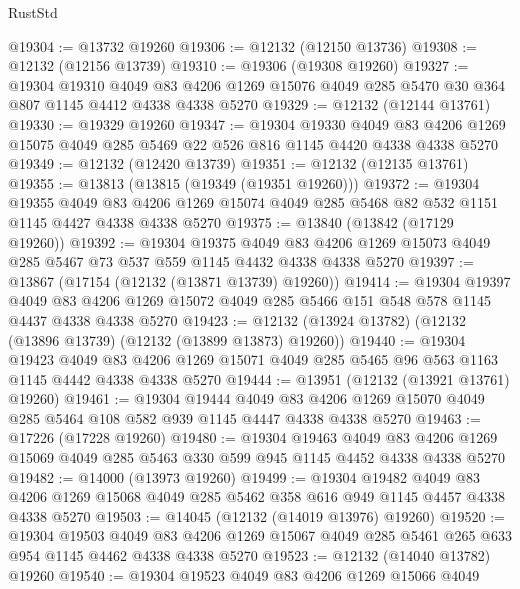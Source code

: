 \begin{lexlean}{RustStd}
\begin{coremodule}
{\begin{coremodule}
{{{{{{{{{{{{{{{{{{{{{{{{{{{{{{{{{{{{{{{{{{{{{{{{{{@19304 := @13732 @19260
@19306 := @12132 (@12150 @13736)
@19308 := @12132 (@12156 @13739)
@19310 := @19306 (@19308 @19260)
@19327 := @19304
    @19310
    @4049
    @83
    @4206
    @1269
    @15076
    @4049
    @285
    @5470
    @30
    @364
    @807
    @1145
    @4412
    @4338
    @4338
    @5270
@19329 := @12132 (@12144 @13761)
@19330 := @19329 @19260
@19347 := @19304
    @19330
    @4049
    @83
    @4206
    @1269
    @15075
    @4049
    @285
    @5469
    @22
    @526
    @816
    @1145
    @4420
    @4338
    @4338
    @5270
@19349 := @12132 (@12420 @13739)
@19351 := @12132 (@12135 @13761)
@19355 := @13813 (@13815 (@19349 (@19351 @19260)))
@19372 := @19304
    @19355
    @4049
    @83
    @4206
    @1269
    @15074
    @4049
    @285
    @5468
    @82
    @532
    @1151
    @1145
    @4427
    @4338
    @4338
    @5270
@19375 := @13840 (@13842 (@17129 @19260))
@19392 := @19304
    @19375
    @4049
    @83
    @4206
    @1269
    @15073
    @4049
    @285
    @5467
    @73
    @537
    @559
    @1145
    @4432
    @4338
    @4338
    @5270
@19397 := @13867 (@17154 (@12132 (@13871 @13739) @19260))
@19414 := @19304
    @19397
    @4049
    @83
    @4206
    @1269
    @15072
    @4049
    @285
    @5466
    @151
    @548
    @578
    @1145
    @4437
    @4338
    @4338
    @5270
@19423 := @12132 (@13924 @13782) (@12132 (@13896 @13739) (@12132 (@13899 @13873) @19260))
@19440 := @19304
    @19423
    @4049
    @83
    @4206
    @1269
    @15071
    @4049
    @285
    @5465
    @96
    @563
    @1163
    @1145
    @4442
    @4338
    @4338
    @5270
@19444 := @13951 (@12132 (@13921 @13761) @19260)
@19461 := @19304
    @19444
    @4049
    @83
    @4206
    @1269
    @15070
    @4049
    @285
    @5464
    @108
    @582
    @939
    @1145
    @4447
    @4338
    @4338
    @5270
@19463 := @17226 (@17228 @19260)
@19480 := @19304
    @19463
    @4049
    @83
    @4206
    @1269
    @15069
    @4049
    @285
    @5463
    @330
    @599
    @945
    @1145
    @4452
    @4338
    @4338
    @5270
@19482 := @14000 (@13973 @19260)
@19499 := @19304
    @19482
    @4049
    @83
    @4206
    @1269
    @15068
    @4049
    @285
    @5462
    @358
    @616
    @949
    @1145
    @4457
    @4338
    @4338
    @5270
@19503 := @14045 (@12132 (@14019 @13976) @19260)
@19520 := @19304
    @19503
    @4049
    @83
    @4206
    @1269
    @15067
    @4049
    @285
    @5461
    @265
    @633
    @954
    @1145
    @4462
    @4338
    @4338
    @5270
@19523 := @12132 (@14040 @13782) @19260
@19540 := @19304
    @19523
    @4049
    @83
    @4206
    @1269
    @15066
    @4049
}}}}}}}}}}}}}}}}}}}}}}}}}}}}}}}}}}}}}}}}}}}}}}}}}}
\end{coremodule}}
\end{coremodule}
\end{lexlean}
